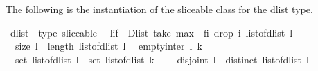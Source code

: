 %
\begin{isabellebody}%
%
%
\begin{isamarkuptext}%
\label{sec:theory-sliceable-dlist}%
\end{isamarkuptext}\isamarkuptrue%
%
\isadelimtheory
%
\endisadelimtheory
%
\isatagtheory
%
\endisatagtheory
{\isafoldtheory}%
%
\isadelimtheory
%
\endisadelimtheory
%
\isadelimproof
%
\endisadelimproof
%
\isatagproof
%
\endisatagproof
{\isafoldproof}%
%
\isadelimproof
%
\endisadelimproof
%
\isadelimproof
%
\endisadelimproof
%
\isatagproof
%
\endisatagproof
{\isafoldproof}%
%
\isadelimproof
%
\endisadelimproof
%
\begin{isamarkuptext}%
The following is the instantiation of the sliceable class for the dlist type.%
\end{isamarkuptext}\isamarkuptrue%
\isamarkupfalse%
\ dlist\ {\isacharcolon}{\isacharcolon}\ {\isacharparenleft}type{\isacharparenright}\ sliceable\isanewline
{}\isanewline
\isanewline
{}\isamarkupfalse%
\isanewline
\ \ {\isachardoublequoteopen}l{\isasymdagger}i{\isachardot}{\isachardot}f\ {\isacharequal}\ Dlist\ {\isacharparenleft}take\ {\isacharparenleft}max\ {}\ {\isacharparenleft}f{\isacharminus}i{\isacharparenright}{\isacharparenright}\ {\isacharparenleft}drop\ i\ {\isacharparenleft}list{\isacharunderscore}of{\isacharunderscore}dlist\ l{\isacharparenright}{\isacharparenright}{\isacharparenright}{\isachardoublequoteclose}\isanewline
\isanewline
{}\isamarkupfalse%
\ \isanewline
\ \ {\isachardoublequoteopen}size\ l\ {\isacharequal}\ length\ {\isacharparenleft}list{\isacharunderscore}of{\isacharunderscore}dlist\ l{\isacharparenright}{\isachardoublequoteclose}\isanewline
\isanewline
{}\isamarkupfalse%
\isanewline
\ \ {\isachardoublequoteopen}empty{\isacharunderscore}inter\ l\ k\ {\isacharequal}\ \isanewline
\ \ {\isacharparenleft}{\isacharparenleft}set\ {\isacharparenleft}list{\isacharunderscore}of{\isacharunderscore}dlist\ l{\isacharparenright}{\isacharparenright}\ {\isasyminter}\ {\isacharparenleft}set\ {\isacharparenleft}list{\isacharunderscore}of{\isacharunderscore}dlist\ k{\isacharparenright}{\isacharparenright}\ {\isacharequal}\ {\isacharbraceleft}{\isacharbraceright}{\isacharparenright}{\isachardoublequoteclose}\isanewline
\isanewline
{}\isamarkupfalse%
\isanewline
\ \ {\isachardoublequoteopen}disjoint\ l\ {\isacharequal}\ distinct\ {\isacharparenleft}list{\isacharunderscore}of{\isacharunderscore}dlist\ l{\isacharparenright}{\isachardoublequoteclose}\isanewline

\end{isabellebody}
